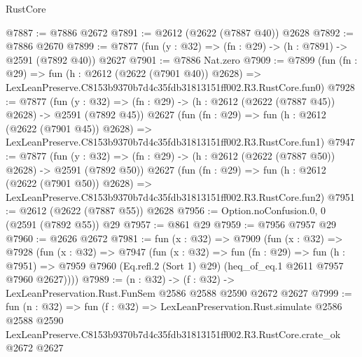\begin{lexlean}{RustCore}
\begin{coremodule}
@7887 := @7886 @2672
@7891 := @2612 (@2622 (@7887 @40)) @2628
@7892 := @7886 @2670
@7899 := @7877 (fun (y : @32) => (fn : @29) -> (h : @7891) -> @2591 (@7892 @40)) @2627
@7901 := @7886 Nat.zero
@7909 := @7899
    (fun (fn : @29) =>
    fun (h : @2612 (@2622 (@7901 @40)) @2628) =>
    LexLeanPreserve.C8153b9370b7d4c35fdb31813151ff002.R3.RustCore.fun0)
@7928 := @7877
    (fun (y : @32) => (fn : @29) -> (h : @2612 (@2622 (@7887 @45)) @2628) -> @2591 (@7892 @45))
    @2627
    (fun (fn : @29) =>
    fun (h : @2612 (@2622 (@7901 @45)) @2628) =>
    LexLeanPreserve.C8153b9370b7d4c35fdb31813151ff002.R3.RustCore.fun1)
@7947 := @7877
    (fun (y : @32) => (fn : @29) -> (h : @2612 (@2622 (@7887 @50)) @2628) -> @2591 (@7892 @50))
    @2627
    (fun (fn : @29) =>
    fun (h : @2612 (@2622 (@7901 @50)) @2628) =>
    LexLeanPreserve.C8153b9370b7d4c35fdb31813151ff002.R3.RustCore.fun2)
@7951 := @2612 (@2622 (@7887 @55)) @2628
@7956 := Option.noConfusion.{0, 0} (@2591 (@7892 @55)) @29
@7957 := @861 @29
@7959 := @7956 @7957 @29
@7960 := @2626 @2672
@7981 := fun (x : @32) =>
  @7909
    (fun (x : @32) =>
    @7928
      (fun (x : @32) =>
      @7947
        (fun (x : @32) =>
        fun (fn : @29) =>
        fun (h : @7951) =>
        @7959 @7960 (Eq.refl.{2} (Sort 1) @29) (heq_of_eq.{1} @2611 @7957 @7960 @2627))))
@7989 := (n : @32) -> (f : @32) -> LexLeanPreservation.Rust.FunSem @2586 @2588 @2590 @2672 @2627
@7999 := fun (n : @32) =>
  fun (f : @32) =>
  LexLeanPreservation.Rust.simulate
    @2586
    @2588
    @2590
    LexLeanPreserve.C8153b9370b7d4c35fdb31813151ff002.R3.RustCore.crate_ok
    @2672
    @2627
\end{coremodule}
\end{lexlean}
